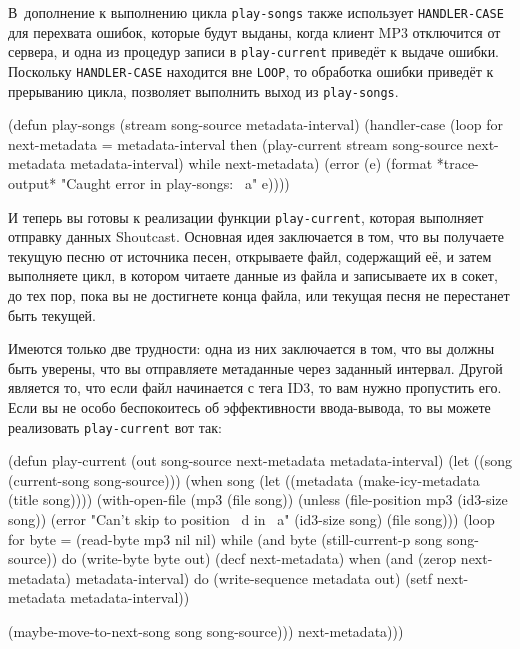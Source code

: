 В~дополнение к выполнению цикла \lstinline{play-songs} также использует \lstinline{HANDLER-CASE}
для перехвата ошибок, которые будут выданы, когда клиент MP3 отключится от сервера, и одна
из процедур записи в \lstinline{play-current} приведёт к выдаче ошибки. Поскольку
\lstinline{HANDLER-CASE} находится вне \lstinline{LOOP}, то обработка ошибки приведёт к прерыванию
цикла, позволяет выполнить выход из \lstinline{play-songs}.

\begin{myverb}
(defun play-songs (stream song-source metadata-interval)
  (handler-case 
      (loop
         for next-metadata = metadata-interval
         then (play-current 
               stream 
               song-source
               next-metadata
               metadata-interval)
         while next-metadata)
    (error (e) (format *trace-output* "Caught error in play-songs: ~a" e))))
\end{myverb}

И теперь вы готовы к реализации функции \lstinline{play-current}, которая выполняет отправку
данных Shoutcast.  Основная идея заключается в том, что вы получаете текущую песню от
источника песен, открываете файл, содержащий её, и затем выполняете цикл, в котором читаете
данные из файла и записываете их в сокет, до тех пор, пока вы не достигнете конца файла,
или текущая песня не перестанет быть текущей.

Имеются только две трудности: одна из них заключается в том, что вы должны быть уверены,
что вы отправляете метаданные через заданный интервал.  Другой является то, что если файл
начинается с тега ID3, то вам нужно пропустить его.  Если вы не особо беспокоитесь об
эффективности ввода-вывода, то вы можете реализовать \lstinline{play-current} вот так:

\begin{myverb}
(defun play-current (out song-source next-metadata metadata-interval)
  (let ((song (current-song song-source)))
    (when song
      (let ((metadata (make-icy-metadata (title song))))
        (with-open-file (mp3 (file song))
          (unless (file-position mp3 (id3-size song))
            (error "Can't skip to position ~d in ~a" (id3-size song) (file song)))
          (loop for byte = (read-byte mp3 nil nil)
             while (and byte (still-current-p song song-source)) do
               (write-byte byte out)
               (decf next-metadata)
             when (and (zerop next-metadata) metadata-interval) do
               (write-sequence metadata out)
               (setf next-metadata metadata-interval))

          (maybe-move-to-next-song song song-source)))
      next-metadata)))
\end{myverb}

